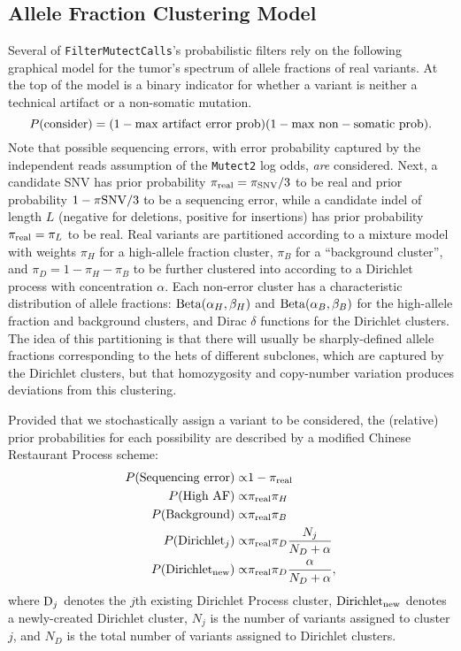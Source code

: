 \documentclass[nofootinbib,amssymb,amsmath]{revtex4}
\newcommand{\code}[1]{\texttt{#1}}
\begin{document}
\subsection{Allele Fraction Clustering Model}
Several of \code{FilterMutectCalls}'s probabilistic filters rely on the following graphical model for the tumor's spectrum of allele fractions of real variants.  At the top of the model is a binary indicator for whether a variant is neither a technical artifact or a non-somatic mutation.
\begin{equation}
P({\rm consider}) = (1 - {\rm max~artifact~error~prob})(1 - {\rm max~non-somatic~prob}).
\end{equation}
Note that possible sequencing errors, with error probability captured by the independent reads assumption of the \code{Mutect2} log odds, \textit{are} considered.  Next, a candidate SNV has prior probability $\pi_{\rm real} = \pi_{\rm SNV} / 3$ to be real and prior probability $1 - \pi{\rm SNV}/3$ to be a sequencing error, while a candidate indel of length $L$ (negative for deletions, positive for insertions) has prior probability $\pi_{\rm real} = \pi_L$ to be real.  Real variants are partitioned according to a mixture model with weights $\pi_{H}$ for a high-allele fraction cluster, $\pi_B$ for a ``background cluster'', and $\pi_{D} = 1 - \pi_H - \pi_B$ to be further clustered into according to a Dirichlet process with concentration $\alpha$.  Each non-error cluster has a characteristic distribution of allele fractions:  ${\rm Beta}(\alpha_H, \beta_H)$ and ${\rm Beta}(\alpha_B, \beta_B)$ for the high-allele fraction and background clusters, and Dirac $\delta$ functions for the Dirichlet clusters.  The idea of this partitioning is that there will usually be sharply-defined allele fractions corresponding to the hets of different subclones, which are captured by the Dirichlet clusters, but that homozygosity and copy-number variation produces deviations from this clustering.

Provided that we stochastically assign a variant to be considered, the (relative) prior probabilities for each possibility are described by a modified Chinese Restaurant Process scheme:
\begin{align}
P({\rm Sequencing~error}) \propto& 1 - \pi_{\rm real} \\
P({\rm High~AF}) \propto& \pi_{\rm real} \pi_H \\
P({\rm Background}) \propto& \pi_{\rm real} \pi_B \\
P({\rm Dirichlet}_j) \propto& \pi_{\rm real} \pi_D \frac{ N_j}{N_D + \alpha} \\
P({\rm Dirichlet}_{\rm new}) \propto& \pi_{\rm real} \pi_D \frac{ \alpha}{N_D + \alpha},
\end{align}
where ${\rm D}_j$ denotes the $j$th existing Dirichlet Process cluster, ${\rm Dirichlet}_{\rm new}$ denotes a newly-created Dirichlet cluster, $N_j$ is the number of variants assigned to cluster $j$, and $N_D$ is the total number of variants assigned to Dirichlet clusters.
\end{document}
